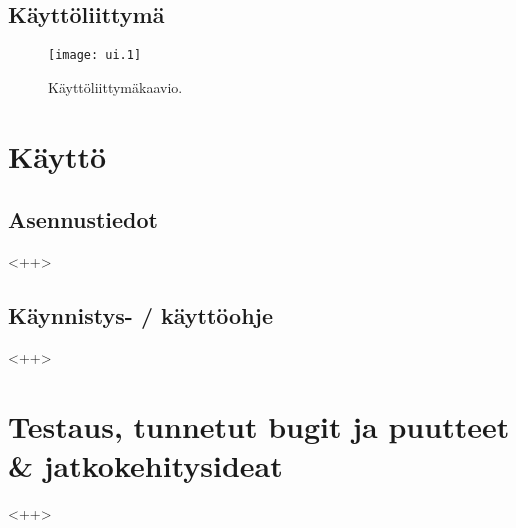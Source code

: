 \documentclass[a4paper,12pt]{report}
\begin{document}

\section{Käyttöliittymä}
\begin{figure}[ht]
   \centering \texttt{[image: ui.1]}
   \caption{Käyttöliittymäkaavio.
   }
   \label{graph_ui}
\end{figure}

\chapter{Käyttö}
\section{Asennustiedot} <++>
\section{Käynnistys- / käyttöohje} <++>

\chapter{Testaus, tunnetut bugit ja puutteet \& jatkokehitysideat} <++>


\end{document}
